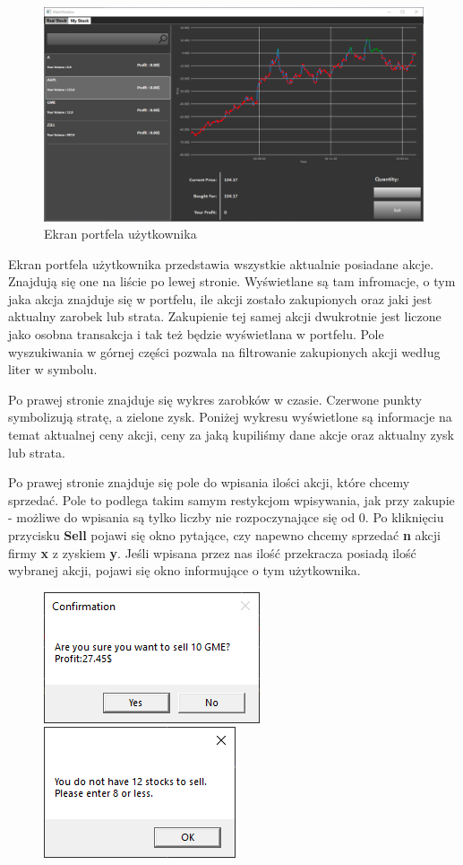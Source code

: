 \documentclass{article}
\begin{document}
\newpage
\begin{figure}[ht]
    \includegraphics[width=\textwidth]{Ekran2.png}
    \caption{Ekran portfela użytkownika}
\end{figure}
\large{
Ekran portfela użytkownika przedstawia wszystkie aktualnie posiadane akcje.
Znajdują się one na liście po lewej stronie. Wyświetlane są tam infromacje, o tym
jaka akcja znajduje się w portfelu, ile akcji zostało zakupionych oraz jaki jest
aktualny zarobek lub strata. Zakupienie tej samej akcji dwukrotnie jest liczone
jako osobna transakcja i tak też będzie wyświetlana w portfelu. Pole
wyszukiwania w górnej części pozwala na filtrowanie zakupionych akcji według
liter w symbolu.

Po prawej stronie znajduje się wykres zarobków w czasie. Czerwone punkty
symbolizują stratę, a zielone zysk. Poniżej wykresu wyświetlone są informacje na
temat aktualnej ceny akcji, ceny za jaką kupiliśmy dane akcje oraz aktualny zysk
lub strata.

Po prawej stronie znajduje się pole do wpisania ilości akcji, które chcemy
sprzedać. Pole to podlega takim samym restykcjom wpisywania, jak przy zakupie -
możliwe do wpisania są tylko liczby nie rozpoczynające się od 0. Po kliknięciu
przycisku \textbf{Sell} pojawi się okno pytające, czy napewno chcemy sprzedać
\textbf{n} akcji firmy \textbf{x} z zyskiem \textbf{y}. Jeśli wpisana przez nas
ilość przekracza posiadą ilość wybranej akcji, pojawi się okno informujące o tym
użytkownika.
}
    \begin{figure}[h]
        \centering
        \includegraphics{sell.png}
        \includegraphics{brak.png}
    \end{figure}  
\end{document}
